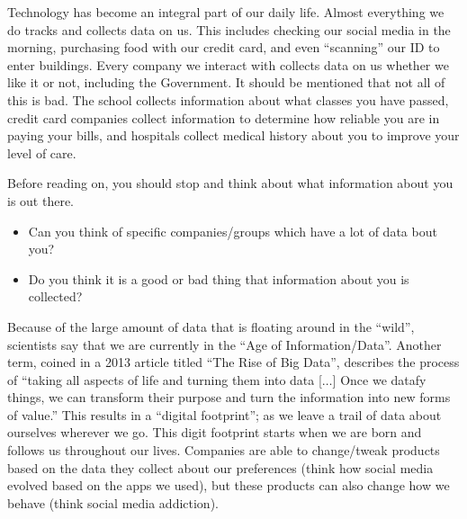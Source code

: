 \documentclass[
  letterpaper,
  DIV=11,
  numbers=noendperiod]{scrreprt}
\providecommand{\tightlist}{%
  \setlength{\itemsep}{0pt}\setlength{\parskip}{0pt}}
\begin{document}
Technology has become an integral part of our daily life. Almost
everything we do tracks and collects data on us. This includes checking
our social media in the morning, purchasing food with our credit card,
and even ``scanning'' our ID to enter buildings. Every company we
interact with collects data on us whether we like it or not, including
the Government. It should be mentioned that not all of this is bad. The
school collects information about what classes you have passed, credit
card companies collect information to determine how reliable you are in
paying your bills, and hospitals collect medical history about you to
improve your level of care.

\begin{tcolorbox}[enhanced jigsaw, colframe=quarto-callout-note-color-frame, colback=white, breakable, rightrule=.15mm, title=\textcolor{quarto-callout-note-color}{\faInfo}\hspace{0.5em}{Reflection}, bottomtitle=1mm, toptitle=1mm, titlerule=0mm, left=2mm, coltitle=black, colbacktitle=quarto-callout-note-color!10!white, leftrule=.75mm, opacitybacktitle=0.6, bottomrule=.15mm, opacityback=0, arc=.35mm, toprule=.15mm]

Before reading on, you should stop and think about what information
about you is out there.

\begin{itemize}
\tightlist
\item
  Can you think of specific companies/groups which have a lot of data
  bout you?
\item
  Do you think it is a good or bad thing that information about you is
  collected?
\end{itemize}

\end{tcolorbox}

Because of the large amount of data that is floating around in the
``wild'', scientists say that we are currently in the ``Age of
Information/Data''. Another term, coined in a 2013 article titled ``The
Rise of Big Data'', describes the process of ``taking all aspects of
life and turning them into data {[}\(\dots\){]} Once we datafy things,
we can transform their purpose and turn the information into new forms
of value.'' This results in a ``digital footprint''; as we leave a trail
of data about ourselves wherever we go. This digit footprint starts when
we are born and follows us throughout our lives. Companies are able to
change/tweak products based on the data they collect about our
preferences (think how social media evolved based on the apps we used),
but these products can also change how we behave (think social media
addiction).
\end{document}
